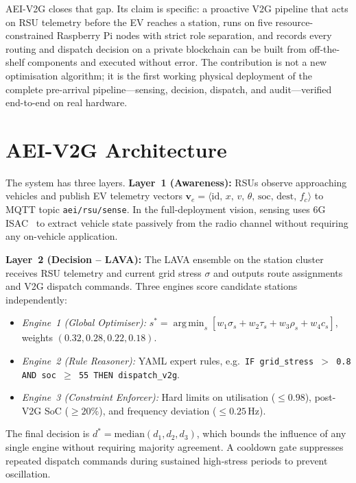 \documentclass[journal,twoside,twocolumn]{IEEEtran}
\DeclareMathOperator*{\argmin}{arg\,min}
\begin{document}
AEI-V2G closes that gap. Its claim is specific: a proactive V2G pipeline that
acts on RSU telemetry before the EV reaches a station, runs on five
resource-constrained Raspberry Pi nodes with strict role separation, and records
every routing and dispatch decision on a private blockchain can be built from
off-the-shelf components and executed without error. The contribution is not a
new optimisation algorithm; it is the first working physical deployment of the
complete pre-arrival pipeline---sensing, decision, dispatch, and audit---verified
end-to-end on real hardware.

\section{AEI-V2G Architecture}
\label{sec:arch}

The system has three layers. \textbf{Layer~1 (Awareness):} RSUs observe
approaching vehicles and publish EV telemetry vectors
$\mathbf{v}_e = \langle\text{id},\, x,\, v,\, \theta,\, \text{soc},\,
\text{dest},\, f_c\rangle$ to MQTT topic \texttt{aei/rsu/sense}. In the
full-deployment vision, sensing uses 6G ISAC~\cite{isac2023} to extract vehicle
state passively from the radio channel without requiring any on-vehicle
application.

\textbf{Layer~2 (Decision -- LAVA):} The LAVA ensemble on the station cluster
receives RSU telemetry and current grid stress $\sigma$ and outputs route
assignments and V2G dispatch commands. Three engines score candidate stations
independently:
\begin{itemize}\setlength\itemsep{1pt}
  \item \textit{Engine~1 (Global Optimiser):} $s^* = \argmin_{s}
  [w_1\sigma_s + w_2\tau_s + w_3\rho_s + w_4 c_s]$,
  weights $(0.32, 0.28, 0.22, 0.18)$.
  \item \textit{Engine~2 (Rule Reasoner):} YAML expert rules, e.g.\
  \texttt{IF grid\_stress $>$ 0.8 AND soc $\geq$ 55 THEN dispatch\_v2g}.
  \item \textit{Engine~3 (Constraint Enforcer):} Hard limits on utilisation
  ($\leq 0.98$), post-V2G SoC ($\geq 20\%$), and frequency deviation
  ($\leq 0.25$\,Hz).
\end{itemize}
The final decision is $d^* = \mathrm{median}(d_1, d_2, d_3)$, which bounds
the influence of any single engine without requiring majority agreement. A
cooldown gate suppresses repeated dispatch commands during sustained high-stress
periods to prevent oscillation.
\end{document}

